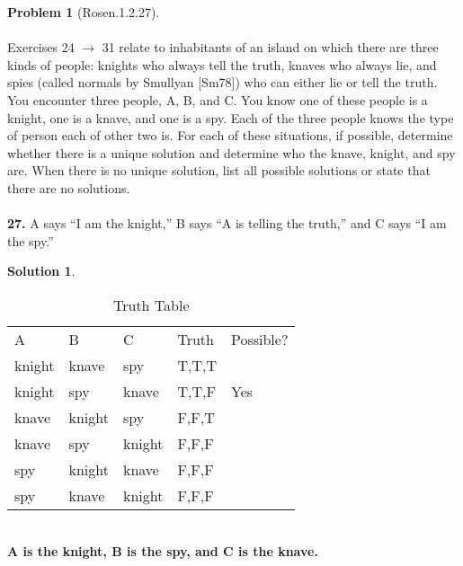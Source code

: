 \documentclass{article}
\theoremstyle{definition}
\newtheorem*{problem}{Problem}
\newtheorem*{solution}{Solution}
\begin{document}
\begin{problem}[Rosen.1.2.27]\ \\
\ \\
Exercises 24 $\rightarrow$ 31 relate to inhabitants of an island on which
there are three kinds of people: knights who always tell the
truth, knaves who always lie, and spies (called normals by
Smullyan [Sm78]) who can either lie or tell the truth. You
encounter three people, A, B, and C. You know one of these
people is a knight, one is a knave, and one is a spy. Each of the
three people knows the type of person each of other two is. For
each of these situations, if possible, determine whether there
is a unique solution and determine who the knave, knight, and
spy are. When there is no unique solution, list all possible
solutions or state that there are no solutions.\ \\
\ \\
\textbf{27.} A says “I am the knight,” B says “A is telling the truth,”
and C says “I am the spy.”
\begin{compactenum}
\renewcommand{\theenumi}{\alph{enumi}}

\end{compactenum}
\end{problem}

\begin{solution}\ \\
\noindent 
\begin{table}[htbp]
  \centering
  \caption{Truth Table}
    \begin{tabular}{llllr}
    A     & B     & C     & Truth & \multicolumn{1}{l}{Possible?} \\
    knight & knave & spy   & T,T,T &  \\
    knight & spy   & knave & T,T,F & \multicolumn{1}{l}{Yes} \\
    knave & knight & spy   & F,F,T &  \\
    knave & spy   & knight & F,F,F &  \\
    spy   & knight & knave & F,F,F &  \\
    spy   & knave & knight & F,F,F &  \\
    \end{tabular}%
  \label{tab:addlabel}%
\end{table}%
\ \\
\textbf{A is the knight, B is the spy, and C is the knave.}




\begin{compactenum}
\renewcommand{\theenumi}{\alph{enumi}}


\end{compactenum}
\end{solution}
\end{document}
